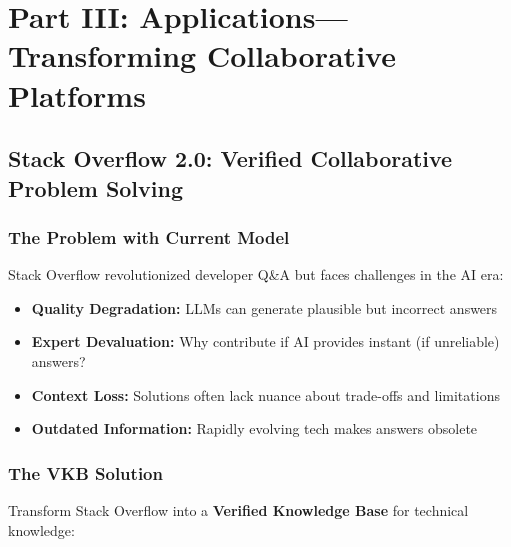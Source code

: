 \documentclass[11pt,a4paper]{article}
\theoremstyle{definition}
\theoremstyle{remark}
\begin{document}
\section{Part III: Applications—Transforming Collaborative Platforms}

\subsection{Stack Overflow 2.0: Verified Collaborative Problem Solving}

\subsubsection{The Problem with Current Model}

Stack Overflow revolutionized developer Q\&A but faces challenges in the AI era:
\begin{itemize}
    \item \textbf{Quality Degradation:} LLMs can generate plausible but incorrect answers
    \item \textbf{Expert Devaluation:} Why contribute if AI provides instant (if unreliable) answers?
    \item \textbf{Context Loss:} Solutions often lack nuance about trade-offs and limitations
    \item \textbf{Outdated Information:} Rapidly evolving tech makes answers obsolete
\end{itemize}

\subsubsection{The VKB Solution}

Transform Stack Overflow into a \textbf{Verified Knowledge Base} for technical knowledge:
\end{document}
